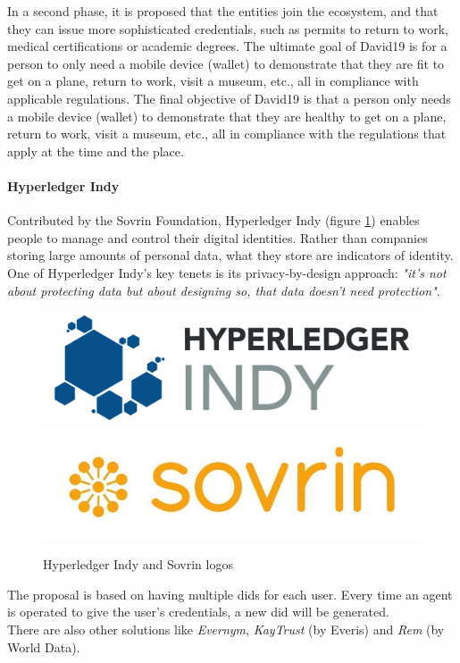 In a second phase\cite{que-es-david19}, it is proposed that the entities join the ecosystem, and that they can issue more sophisticated credentials, such as permits to return to work, medical certifications or academic degrees. The ultimate goal of David19 is for a person to only need a mobile device (wallet) to demonstrate that they are fit to get on a plane, return to work, visit a museum, etc., all in compliance with applicable regulations. The final objective of David19 is that a person only needs a mobile device (wallet) to demonstrate that they are healthy to get on a plane, return to work, visit a museum, etc., all in compliance with the regulations that apply at the time and the place.

\paragraph{Hyperledger Indy}
Contributed by the Sovrin Foundation\cite{sovrin-yt,sovrin}, Hyperledger Indy\cite{indy-gh,indy} (figure \ref{fig:indy}) enables people to manage and control their digital identities. Rather than companies storing large amounts of personal data, what they store are indicators of identity. One of Hyperledger Indy's key tenets is its privacy-by-design approach: \textit{"it's not about protecting data but about designing so, that data doesn't need protection"}.\\
\begin{figure}[h]
    \centering
    \includegraphics[width=.3\textwidth]{images/State of the Art/ssi/hyper-indy.png}
    \includegraphics[width=.3\textwidth]{images/State of the Art/ssi/Sovrin-Logo.jpg}\hfill
    \caption{Hyperledger Indy and Sovrin logos}
    \label{fig:indy}
\end{figure}

The proposal is based on having multiple \acrshort{did}s for each user. Every time an agent is operated to give the user's credentials, a new \acrshort{did} will be generated.\\

There are also other solutions\cite{ssi-wallets} like \textit{Evernym}, \textit{KayTrust} (by Everis) and \textit{Rem} (by World Data).
